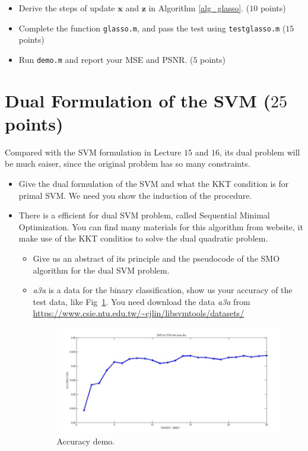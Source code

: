 \documentclass[10pt]{article}
\renewcommand{\mathbf}{\boldsymbol}
\newcommand{\mb}{\mathbf}
\newcommand{\matlab}[1]{\texttt{#1}}
\begin{document}
\begin{itemize}
	\item Derive the steps of update $\mb{x}$ and $\mb{z}$ in Algorithm \ref{alg_glasso}. ($10$ points)
	
	\item Complete the function \matlab{glasso.m}, and pass the test using \matlab{testglasso.m} ($15$ points)
	
	\item Run \matlab{demo.m} and report your MSE and PSNR. ($5$ points)
	
\end{itemize} 

\section*{Dual Formulation of the SVM ($25$ points)}
Compared with the SVM formulation in Lecture $15$ and $16$, its dual problem will be much eaiser, since the original problem has so many constraints.
\begin{itemize}
	\item Give the dual formulation of the SVM and what  the KKT condition is for primal SVM. We need you show the induction of the procedure. 
	\item There is a efficient for dual SVM problem, called Sequential Minimal Optimization. You can find many materials for this algorithm from website, it make use of the KKT conditios to solve the dual quadratic problem. 
	\begin{itemize}
		\item Give us an abstract of its principle and the pseudocode of the SMO algorithm for the dual SVM problem.
		\item \emph{a3a} is a data for the binary classification, show us your accuracy of the test data, like Fig~\ref{fig.3}. You need download the data \emph{a3a} from \url{https://www.csie.ntu.edu.tw/~cjlin/libsvmtools/datasets/}
		\begin{figure}[ht]
			\centering
			\includegraphics[width=0.8\linewidth]{fig1.png}
			\caption{Accuracy demo.}
			\label{fig.3}
		\end{figure}
	\end{itemize}
	
\end{itemize}
\end{document}
